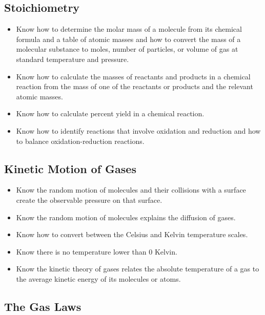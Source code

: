 \documentclass[11pt]{article}
\begin{document}
\subsection{Stoichiometry}
\label{sec:orgf2e3459}

\begin{itemize}
\item Know how to determine the molar mass of a molecule from its chemical formula and a table of atomic masses and how to convert the mass of a molecular substance to moles, number of particles, or volume of gas at standard temperature and pressure.
\item Know how to calculate the masses of reactants and products in a chemical reaction from the mass of one of the reactants or products and the relevant atomic masses.
\item Know how to calculate percent yield in a chemical reaction.
\item Know how to identify reactions that involve oxidation and reduction and how to balance oxidation-reduction reactions.
\end{itemize}
\subsection{Kinetic Motion of Gases}
\label{sec:org04f5883}

\begin{itemize}
\item Know the random motion of molecules and their collisions with a surface create the observable pressure on that surface.
\item Know the random motion of molecules explains the diffusion of gases.
\item Know how to convert between the Celsius and Kelvin temperature scales.
\item Know there is no temperature lower than 0 Kelvin.
\item Know the kinetic theory of gases relates the absolute temperature of a gas to the average kinetic energy of its molecules or atoms.
\end{itemize}
\subsection{The Gas Laws}
\label{sec:orgc2753c7}
\end{document}
